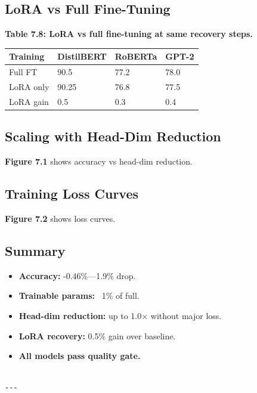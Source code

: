 \subsection{LoRA vs Full Fine-Tuning}

\textbf{Table 7.8: LoRA vs full fine-tuning at same recovery steps.}

\begin{table}[H]
\centering
\small
\begin{tabular}{llll}
\toprule
\textbf{Training} & \textbf{DistilBERT} & \textbf{RoBERTa} & \textbf{GPT-2} \\
\midrule
Full FT & 90.5 & 77.2 & 78.0 \\
LoRA only & 90.25 & 76.8 & 77.5 \\
LoRA gain & 0.5 & 0.3 & 0.4 \\
\bottomrule
\end{tabular}
\end{table}

\subsection{Scaling with Head-Dim Reduction}

\textbf{Figure 7.1} shows accuracy vs head-dim reduction.

\subsection{Training Loss Curves}

\textbf{Figure 7.2} shows loss curves.

\subsection{Summary}

\begin{itemize}
\item \textbf{Accuracy:} -0.46\%---1.9\% drop.
\item \textbf{Trainable params:} ~1\% of full.
\item \textbf{Head-dim reduction:} up to 1.0$\times$ without major loss.
\item \textbf{LoRA recovery:} 0.5\% gain over baseline.
\item \textbf{All models pass quality gate.}
\end{itemize}
\begin{lstlisting}

---
\end{lstlisting}

